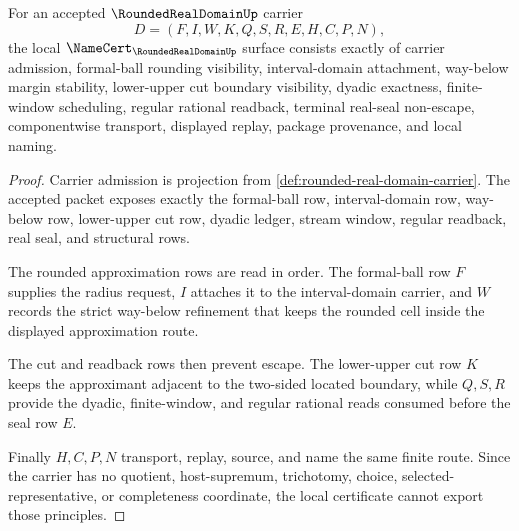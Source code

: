 \begin{theorem}
\label{thm:rounded-real-domain-namecert-obligations}
For an accepted $\RoundedRealDomainUp$ carrier
$$
D=(F,I,W,K,Q,S,R,E,H,C,P,N),
$$
the local $\NameCert_{\RoundedRealDomainUp}$ surface consists exactly of carrier admission, formal-ball rounding visibility, interval-domain attachment, way-below margin stability, lower-upper cut boundary visibility, dyadic exactness, finite-window scheduling, regular rational readback, terminal real-seal non-escape, componentwise transport, displayed replay, package provenance, and local naming.
\end{theorem}
\begin{proof}
Carrier admission is projection from \autoref{def:rounded-real-domain-carrier}. The accepted packet exposes exactly the formal-ball row, interval-domain row, way-below row, lower-upper cut row, dyadic ledger, stream window, regular readback, real seal, and structural rows.

The rounded approximation rows are read in order. The formal-ball row $F$ supplies the radius request, $I$ attaches it to the interval-domain carrier, and $W$ records the strict way-below refinement that keeps the rounded cell inside the displayed approximation route.

The cut and readback rows then prevent escape. The lower-upper cut row $K$ keeps the approximant adjacent to the two-sided located boundary, while $Q,S,R$ provide the dyadic, finite-window, and regular rational reads consumed before the seal row $E$.

Finally $H,C,P,N$ transport, replay, source, and name the same finite route. Since the carrier has no quotient, host-supremum, trichotomy, choice, selected-representative, or completeness coordinate, the local certificate cannot export those principles.
\end{proof}

